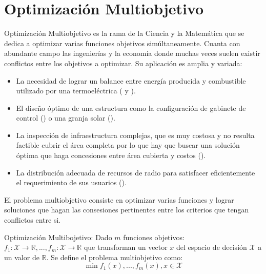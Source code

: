 \section{Optimizaci\'on Multiobjetivo}\label{background:moo}
Optimizaci\'on Multiobjetivo es la rama de la Ciencia y la Matem\'atica que se dedica a optimizar varias funciones objetivos sim\'ultaneamente. Cuanta con abundante campo las ingenier\'ias y la econom\'ia donde muchas veces suelen existir conflictos entre los objetivos a optimizar. Su aplicaci\'on es amplia y variada: 
\begin{itemize}
    \item La necesidad de lograr un balance entre energ\'ia producida y combustible utilizado por una termoel\'ectrica (\cite{shirazi2012thermal} y \cite{shirazi2014thermal}).
    \item El dise\~no \'optimo de una estructura como la configuraci\'on de gabinete de control (\cite{pllana2019customizing}) o una granja solar (\cite{ganesan2013hypervolume}).
    \item La inspecci\'on de infraestructura complejas, que es muy costosa y no resulta factible cubrir el \'area completa por lo que hay que buscar una soluci\'on \'optima que haga concesiones entre \'area cubierta y costos (\cite{ellefsen2017multiobjective}).
    \item La distribuci\'on adecuada de recursos de radio para satisfacer eficientemente el requerimiento de sus usuarios (\cite{bjornson2013optimal}).
\end{itemize}

El problema multiobjetivo consiste en optimizar varias funciones y lograr soluciones que hagan las consesiones pertinentes entre los criterios que tengan conflictos entre si.
\begin{definition}{Optimizaci\'on Multibojetivo:}
    \label{background:def:moo}
     Dado $m$ funciones objetivos: $f_1: \mathcal{X} \rightarrow \mathbb{R}, ..., f_m: \mathcal{X} \rightarrow \mathbb{R}$ que transforman un vector $x$ del espacio de decisi\'on $\mathcal{X}$ a un valor de $\mathbb{R}$. Se define el problema multiobjetivo como:
    \begin{equation*}
        \min f_1(x), ..., f_m(x), x \in \mathcal{X}
    \end{equation*}
\end{definition}

